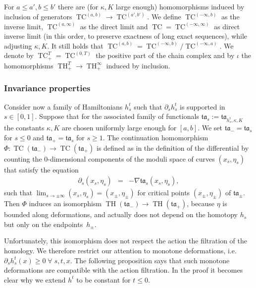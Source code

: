 \documentclass{amsart}
\newcommand{\tacal}{{\mathfrak{ta}}}
\renewcommand{\TH}{\operatorname{TH}}
\newcommand{\TC}{\operatorname{TC}}
\theoremstyle{definition}
\theoremstyle{remark}
\numberwithin{equation}{section}
\begin{document}
For $a\leq a', b\leq b'$ there are (for $\kappa,K$ large enough) homomorphisms induced by inclusion of generators $\TC^{(a,b)}\to\TC^{(a',b')}$. We define $\TC^{(-\infty,b)}$ as the inverse limit, $\TC^{(a,\infty)}$ as the direct limit and $\TC=\TC^{(-\infty,\infty)}$ as direct inverse limit (in this order, to preserve exactness of long exact sequences), while adjusting $\kappa,K$. It still holds that $\TC^{(a,b)}=\TC^{(-\infty,b)}/\TC^{(-\infty,a)}$. We denote by $\TC_+^T=\TC^{(0,T)}$ the positive part of the chain complex and by $\iota$ the homomorphisms $\TH_+^T\to\TH_+^\infty$ induced by inclusion.

\subsubsection*{Invariance properties}
Consider now a family of Hamiltonians $h_s^t$ such that $\partial_sh_s^t$ is supported in $s\in[0,1]$. Suppose that for the associated family of functionals $\tacal_s:=\tacal_{h^t_s,\kappa,K}$ the constants $\kappa,K$ are chosen uniformly large enough for $[a,b]$. We set $\tacal_-=\tacal_s$ for $s\leq0$ and $\tacal_+=\tacal_s$ for $s\geq1$. The continuation homomorphism $\Phi:\TC(\tacal_-)\to\TC(\tacal_+)$ is defined as in the definition of the differential by counting the 0-dimensional components of the moduli space of curves $(x_s,\eta_s)$ that satisfy the equation
\begin{eqnarray}\label{conteqn}
	\partial_s(x_s,\eta_s)&=&-\nabla\tacal_s(x_s,\eta_s),
\end{eqnarray}
such that $\lim_{s\to\pm\infty}(x_s,\eta_s)=(x_\pm,\eta_\pm)$ for critical points $(x_\pm,\eta_\pm)$ of $\tacal_\pm$. Then $\Phi$ induces an isomorphism $\TH(\tacal_-)\to \TH(\tacal_+)$, because $\eta$ is bounded along deformations, and actually does not depend on the homotopy $h_s$ but only on the endpoints~$h_\pm$.

Unfortunately, this isomorphism does not respect the action the filtration of the homology. We therefore restrict our attention to monotone deformations, i.e.\ $\partial_sh_s^t(x)\geq0\;\forall\; s,t,x$. The following proposition says that such monotone deformations are compatible with the action filtration. In the proof it becomes clear why we extend $h^t$ to be constant for $t\leq0$.
\end{document}

